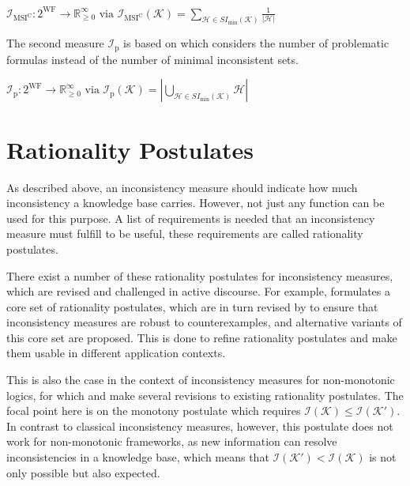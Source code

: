 \begin{definition}
    \(\mathcal{I}_{\text{MSI}^\text{C}}: 2^{\text{WF}} \rightarrow \mathbb{R}_{\geq 0}^{\infty} \text{ via } \mathcal{I}_{\text{MSI}^\text{C}}(\mathcal{K}) = \sum\limits_{\mathcal{H} \in SI_{\min}(\mathcal{K})} \frac{1}{|\mathcal{H}|}\)
\end{definition}

The second measure \(\mathcal{I}_{\text{p}}\) is based on \cite{liu_measuring_2011} which considers the number of problematic formulas instead of the number of minimal inconsistent sets.

\begin{definition}
    \(\mathcal{I}_{\text{p}}: 2^{\text{WF}} \rightarrow \mathbb{R}_{\geq 0}^{\infty} \text{ via } \mathcal{I}_{\text{p}}(\mathcal{K}) = \left| \bigcup\limits_{\mathcal{H} \in SI_{\min}(\mathcal{K})} \mathcal{H} \right|\)
\end{definition}

\section{Rationality Postulates}
As described above, an inconsistency measure should indicate how much inconsistency a knowledge base carries. However, not just any function can be used for this purpose. A list of requirements is needed that an inconsistency measure must fulfill to be useful, these requirements are called rationality postulates.

There exist a number of these rationality postulates for inconsistency measures, which are revised and challenged in active discourse. For example, \cite{hunter_measure_2010} formulates a core set of rationality postulates, which are in turn revised by \cite{hameurlain_basic_2017} to ensure that inconsistency measures are robust to counterexamples, and alternative variants of this core set are proposed. This is done to refine rationality postulates and make them usable in different application contexts.

This is also the case in the context of inconsistency measures for non-monotonic logics, for which \cite{ulbricht_measuring_2018} and \cite{ulbricht_handling_2020} make several revisions to existing rationality postulates. The focal point here is on the monotony postulate which requires \(\mathcal{I}(\mathcal{K}) \leq \mathcal{I}(\mathcal{K}')\). In contrast to classical inconsistency measures, however, this postulate does not work for non-monotonic frameworks, as new information can resolve inconsistencies in a knowledge base, which means that \(\mathcal{I}(\mathcal{K}') < \mathcal{I}(\mathcal{K})\) is not only possible but also expected.

